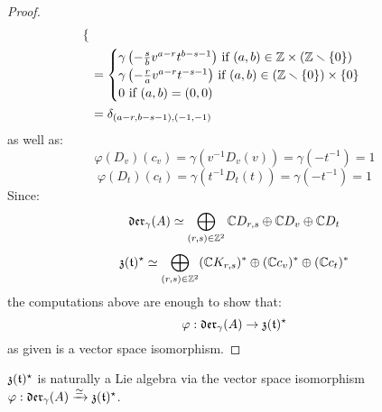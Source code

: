 \begin{proof}
$$\begin{aligned}
\begin{cases}
                            \end{cases}
                            \\
                            & = 
                            \begin{cases}
                                \text{$\gamma\left( -\frac{s}{b} v^{a - r} t^{b - s - 1} \right)$ if $(a, b) \in \Z \x (\Z \setminus \{0\})$}
                                \\
                                \text{$\gamma\left( -\frac{r}{a} v^{a - r} t^{-s - 1} \right)$ if $(a, b) \in (\Z \setminus \{0\}) \x \{0\}$}
                                \\
                                \text{$0$ if $(a, b) = (0, 0)$}
                            \end{cases}
                            \\
                            & = \delta_{(a - r, b - s - 1), (-1, -1)}
                        \end{aligned}
                    $$
                as well as:
                    $$\varphi(D_v)(c_v) = \gamma(v^{-1} D_v(v)) = \gamma( -t^{-1} ) = 1$$
                    $$\varphi(D_t)(c_t) = \gamma(t^{-1} D_t(t)) = \gamma( -t^{-1} ) = 1$$
                Since:
                    $$\mathfrak{der}_{\gamma}(A) \simeq \bigoplus_{(r, s) \in \mathbb{Z}^2} \mathbb{C} D_{r, s} \oplus \mathbb{C} D_v \oplus \mathbb{C} D_t$$
                    $$\mathfrak{z}(\mathfrak{t})^{\star} \simeq \bigoplus_{(r, s) \in \mathbb{Z}^2} (\mathbb{C} K_{r, s})^* \oplus (\mathbb{C} c_v)^* \oplus (\mathbb{C} c_t)^*$$
                the computations above are enough to show that:
                    $$\varphi: \mathfrak{der}_{\gamma}(A) \to \mathfrak{z}(\mathfrak{t})^{\star}$$
                as given is a vector space isomorphism.
            \end{proof}
        \begin{corollary} \label{coro: lie_bracket_on_graded_dual_of_toroidal_centres}
            $\mathfrak{z}(\mathfrak{t})^{\star}$ is naturally a Lie algebra via the vector space isomorphism $\varphi: \mathfrak{der}_{\gamma}(A) \xrightarrow[]{\simeq} \mathfrak{z}(\mathfrak{t})^{\star}$.
        \end{corollary}
